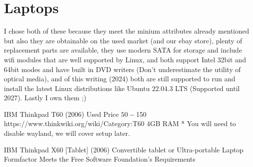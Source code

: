 \section{Laptops}
I chose both of these because they meet the minium attributes already mentioned but also they are obtainable on the used market (and our ebay store), plenty of replacement parts are available, they use modern SATA for storage and include wifi modules that are well supported by Linux, and both support Intel 32bit and 64bit modes and have built in DVD writers (Don’t underestimate the utility of optical media), and of this writing (2024) both are still supported to run and install the latest Linux distributions like Ubuntu 22.04.3 LTS (Supported until 2027).  Lastly I own them ;)

IBM Thinkpad T60 (2006)
Used Price $50 - $150
https://www.thinkwiki.org/wiki/Category:T60
4GB RAM * You will need to disable wayland, we will cover setup later. 

IBM Thinkpad X60 [Tablet] (2006)
Convertible tablet or Ultra-portable Laptop Formfactor
Meets the Free Software Foundation’s Requirements

